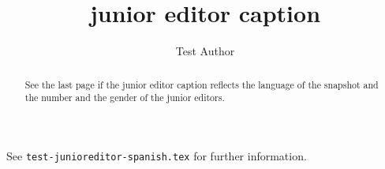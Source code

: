 \documentclass{snapshotmfo}
\author{Test Author}
\title{junior editor caption}
\begin{document}
\begin{abstract}
See the last page if the junior editor caption reflects the language of the snapshot and the number and the gender of the junior editors.
\end{abstract}

See \texttt{test-junioreditor-spanish.tex} for further information.
\end{document}
